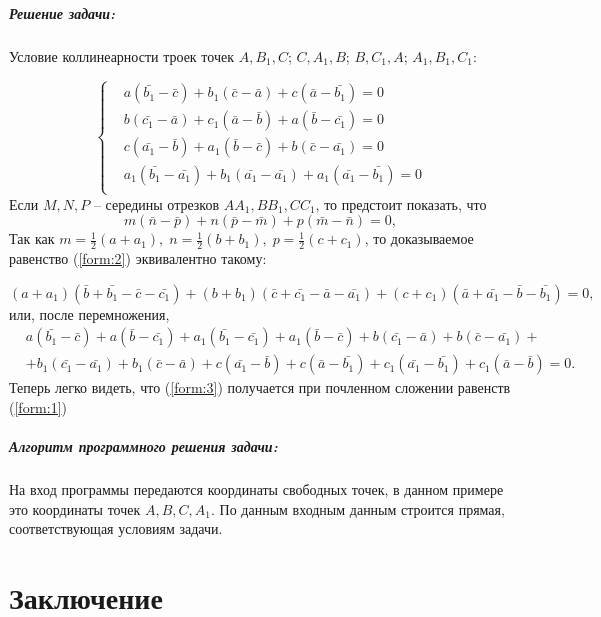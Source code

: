\documentclass[oneside,final,14pt]{extreport}
\newcommand\tcchapter[1]{%
  \chapter*{#1}%
  \addcontentsline{toc}{chapter}{#1}}
\begin{document}
\paragraph{Решение задачи:}
Условие коллинеарности троек точек \(A, B_1 , C\); \(C,
A_1 , B\); \(B, C_1 , A\); \(A_1 , B_1 , C_1\):

\begin{equation}
    \left\{ \begin{aligned}
         & a(\bar{b_1} - \bar{c}) + b_1(\bar{c} - \bar{a}) + c(\bar{a} - \bar{b_1}) = 0             \\
         & b(\bar{c_1} - \bar{a}) + c_1(\bar{a} - \bar{b}) + a(\bar{b} - \bar{c_1}) = 0             \\
         & c(\bar{a_1} - \bar{b}) + a_1(\bar{b} - \bar{c}) + b(\bar{c} - \bar{a_1}) = 0             \\
         & a_1(\bar{b_1} - \bar{a_1}) + b_1(\bar{a_1} - \bar{a_1}) + a_1(\bar{a_1} - \bar{b_1}) = 0 \\
    \end{aligned}
    \right. \label{form:1}
\end{equation}
Если \(M, N, P\) -- середины отрезков \(AA_1, BB_1, CC_1\), то предстоит показать, что
\begin{equation}
    m(\bar{n} -\bar{p})+n(\bar{p}-\bar{m})+p(\bar{m}-\bar{n})=0,
    \label{form:2}
\end{equation}
Так как \(\displaystyle
m=\frac{1}{2}(a+a_1),\;
n=\frac{1}{2}(b+b_1),\;
p=\frac{1}{2}(c+c_1)
\), то доказываемое равенство (\ref{form:2}) эквивалентно такому:

\(
(a+a_1)(\bar{b}+\bar{b_1}-\bar{c}-\bar{c_1})+(b+b_1 )(\bar{c}+\bar{c_1}-\bar{a}-\bar{a_1})+(c+c_1)(\bar{a}+\bar{a_1}-\bar{b}-\bar{b_1})=0,
\) или, после перемножения,
\begin{equation}
    \begin{aligned}
         & a(\bar{b_1} - \bar{c}) + a(\bar{b}- \bar{c_1}) + a_1(\bar{b_1} - \bar{c_1}) + a_1(\bar{b}- \bar{c}) + b(\bar{c_1} - \bar{a}) + b(\bar{c}- \bar{a_1}) + \\
         & +b_1(\bar{c_1}-\bar{a_1})+b_1 (\bar{c}-\bar{a})+c(\bar{a_1}-\bar{b})+c(\bar{a}-\bar{b_1})+c_1 (\bar{a_1}-\bar{b_1} )+c_1(\bar{a}-\bar{b})=0.
    \end{aligned}
    \label{form:3}
\end{equation}
Теперь легко видеть, что (\ref{form:3}) получается при почленном сложении
равенств (\ref{form:1})
\paragraph*{Алгоритм программного решения задачи:} На вход программы передаются координаты свободных точек, в данном примере это координаты точек \(A,B,C,A_1\). По данным входным данным строится прямая, соответствующая условиям задачи.

\tcchapter{Заключение}



\end{document}
